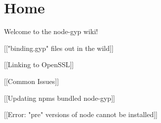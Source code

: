 \chapter{Home}
\hypertarget{md__2_users_2hello_2_documents_2_git_hub_2finalproject-engine-drop-table-engines_2_engine_2src_292cda4417139a8b0cdca20d7630c011e}{}\label{md__2_users_2hello_2_documents_2_git_hub_2finalproject-engine-drop-table-engines_2_engine_2src_292cda4417139a8b0cdca20d7630c011e}
Welcome to the node-\/gyp wiki!


\begin{DoxyItemize}
\item \mbox{[}\mbox{[}"{}binding.\+gyp"{} files out in the wild\mbox{]}\mbox{]}
\item \mbox{[}\mbox{[}Linking to Open\+SSL\mbox{]}\mbox{]}
\item \mbox{[}\mbox{[}Common Issues\mbox{]}\mbox{]}
\item \mbox{[}\mbox{[}Updating npm\textquotesingle{}s bundled node-\/gyp\mbox{]}\mbox{]}
\item \mbox{[}\mbox{[}Error\+: "{}pre"{} versions of node cannot be installed\mbox{]}\mbox{]} 
\end{DoxyItemize}